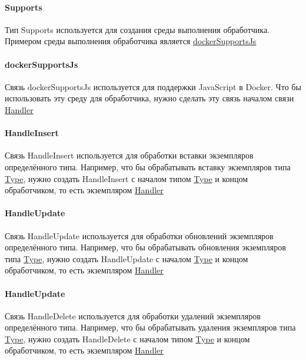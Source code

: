 \documentclass{article}
\begin{document}
\paragraph*{Supports}\hypertarget{Core.Supports.Description}{}
Тип Supports используется для создания среды
выполнения обработчика. Примером среды выполнения обработчика является
\hyperlink{Core.dockerSupportsJs.Description}{dockerSupportsJs}
\paragraph*{dockerSupportsJs}\hypertarget{Core.dockerSupportsJs.Description}{}
Связь dockerSupportsJs используется для
поддержки JavaScript в Docker. Что бы использовать эту среду для обработчика,
нужно сделать эту связь началом связи
\hyperlink{Core.Handler.Description}{Handler}
\paragraph*{HandleInsert}\hypertarget{Core.HandleInsert.Description}{}
Связь HandleInsert используется для обработки
вставки экземпляров определённого типа. Например, что бы обрабатывать вставку
экземпляров типа \hyperlink{Core.Type.Description}{Type}, нужно создать
HandleInsert с
началом типом \hyperlink{Core.Type.Description}{Type} и концом обработчиком, то
есть
экземпляром \hyperlink{Core.Handler.Description}{Handler}
\paragraph*{HandleUpdate}\hypertarget{Core.HandleUpdate.Description}{}
Связь HandleUpdate используется для обработки
обновлений экземпляров определённого типа. Например, что бы обрабатывать
обновления экземпляров типа \hyperlink{Core.Type.Description}{Type}, нужно
создать
HandleUpdate с началом \hyperlink{Core.Type.Description}{Type} и концом
обработчиком,
то есть экземпляром \hyperlink{Core.Handler.Description}{Handler}
\paragraph*{HandleUpdate}\hypertarget{Core.HandleDelete.Description}{}
Связь HandleDelete используется для обработки
удалений экземпляров определённого типа. Например, что бы обрабатывать удаления
экземпляров типа \hyperlink{Core.Type.Description}{Type}, нужно создать
HandleDelete с
началом типом \hyperlink{Core.Type.Description}{Type} и концом обработчиком, то
есть
экземпляром \hyperlink{Core.Handler.Description}{Handler}
\end{document}
